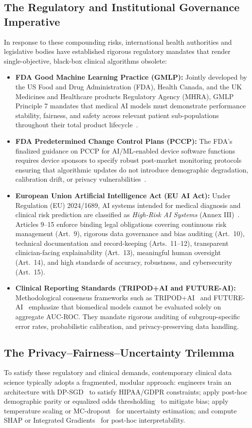 \documentclass[pdflatex,sn-vancouver-num,referee,lineno]{sn-jnl}
\theoremstyle{thmstyleone}
\theoremstyle{thmstylethree}
\begin{document}
\subsection{The Regulatory and Institutional Governance Imperative}
In response to these compounding risks, international health authorities and legislative bodies have established rigorous regulatory mandates that render single-objective, black-box clinical algorithms obsolete:
\begin{itemize}
    \item \textbf{FDA Good Machine Learning Practice (GMLP):} Jointly developed by the US Food and Drug Administration (FDA), Health Canada, and the UK Medicines and Healthcare products Regulatory Agency (MHRA), GMLP Principle 7 mandates that medical AI models must demonstrate performance stability, fairness, and safety across relevant patient sub-populations throughout their total product lifecycle~\cite{fda2021gmlp}.
    \item \textbf{FDA Predetermined Change Control Plans (PCCP):} The FDA's finalized guidance on PCCP for AI/ML-enabled device software functions requires device sponsors to specify robust post-market monitoring protocols ensuring that algorithmic updates do not introduce demographic degradation, calibration drift, or privacy vulnerabilities~\cite{fda2024pccp}.
    \item \textbf{European Union Artificial Intelligence Act (EU AI Act):} Under Regulation (EU) 2024/1689, AI systems intended for medical diagnosis and clinical risk prediction are classified as \emph{High-Risk AI Systems} (Annex III)~\cite{euaiact2024}. Articles 9--15 enforce binding legal obligations covering continuous risk management (Art.~9), rigorous data governance and bias auditing (Art.~10), technical documentation and record-keeping (Arts.~11--12), transparent clinician-facing explainability (Art.~13), meaningful human oversight (Art.~14), and high standards of accuracy, robustness, and cybersecurity (Art.~15).
    \item \textbf{Clinical Reporting Standards (TRIPOD+AI and FUTURE-AI):} Methodological consensus frameworks such as TRIPOD+AI~\cite{tripodai2024} and FUTURE-AI~\cite{futureai2023} emphasize that biomedical models cannot be evaluated solely on aggregate AUC-ROC. They mandate rigorous auditing of subgroup-specific error rates, probabilistic calibration, and privacy-preserving data handling.
\end{itemize}

\subsection{The Privacy--Fairness--Uncertainty Trilemma}
To satisfy these regulatory and clinical demands, contemporary clinical data science typically adopts a fragmented, modular approach: engineers train an architecture with DP-SGD~\cite{abadi2016deep} to satisfy HIPAA/GDPR constraints; apply post-hoc demographic parity or equalized odds thresholding~\cite{hardt2016equality} to mitigate bias; apply temperature scaling or MC-dropout~\cite{gal2016dropout} for uncertainty estimation; and compute SHAP or Integrated Gradients~\cite{sundararajan2017axiomatic,lundberg2017unified} for post-hoc interpretability.
\end{document}
